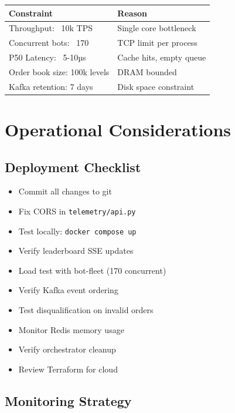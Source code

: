 \documentclass[10pt,a4paper,oneside]{report}
\begin{document}
\begin{table}[H]\small
    \centering
    \begin{tabular}{ll}
    \toprule
    \textbf{Constraint} & \textbf{Reason} \\
    \midrule
    Throughput: ~10k TPS & Single core bottleneck \\
    Concurrent bots: ~170 & TCP limit per process \\
    P50 Latency: ~5-10µs & Cache hits, empty queue \\
    Order book size: 100k levels & DRAM bounded \\
    Kafka retention: 7 days & Disk space constraint \\
    \bottomrule
    \end{tabular}
\end{table}

\chapter{Operational Considerations}

\section{Deployment Checklist}

\begin{itemize}
    \item[\Square] Commit all changes to git
    \item[\Square] Fix CORS in \texttt{telemetry/api.py}
    \item[\Square] Test locally: \texttt{docker compose up}
    \item[\Square] Verify leaderboard SSE updates
    \item[\Square] Load test with bot-fleet (170 concurrent)
    \item[\Square] Verify Kafka event ordering
    \item[\Square] Test disqualification on invalid orders
    \item[\Square] Monitor Redis memory usage
    \item[\Square] Verify orchestrator cleanup
    \item[\Square] Review Terraform for cloud
\end{itemize}

\section{Monitoring Strategy}
\end{document}
